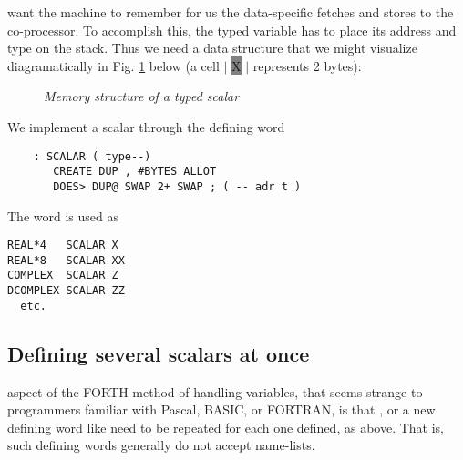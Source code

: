  want the machine to remember for us the data-specific fetches and
stores to the co-processor. To accomplish this, the typed variable has to place
its address and type on the stack. Thus we need a data structure that we might
visualize diagramatically in Fig. \ref{fig:05_01} below (a cell $\mathbf{\big |}$
{\colorbox{gray}{\color{gray}X}} 
$\mathbf{\big |}$ represents 2 bytes): 
\begin{figure}
    \center
    \caption{\textit{Memory structure of a typed scalar}}
    \label{fig:05_01}
\end{figure}
 

We implement a scalar through the defining word

\begin{lstlisting}
    : SCALAR ( type--)
       CREATE DUP , #BYTES ALLOT
       DOES> DUP@ SWAP 2+ SWAP ; ( -- adr t )
\end{lstlisting}

The word  is used as
\begin{lstlisting}
REAL*4   SCALAR X
REAL*8   SCALAR XX
COMPLEX  SCALAR Z
DCOMPLEX SCALAR ZZ
  etc.
\end{lstlisting}

\subsection{Defining several scalars at once}
 aspect of the FORTH method of handling variables, that seems strange to programmers familiar with Pascal, BASIC, or FORTRAN, is that ,  or a new defining word like  need to be repeated for each one defined, as above. That is, such defining words generally do not accept name-lists.


